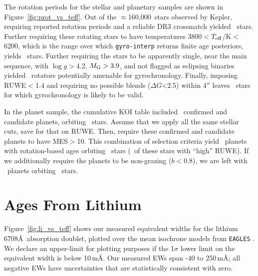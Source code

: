 \documentclass[11pt,twocolumn,tighten]{aastex63}
\newcommand{\nkeplerstars}{$\approx$160{,}000}
\begin{document}
The rotation periods for the stellar and planetary samples are shown
in Figure~\ref{fig:prot_vs_teff}.  Out of the \nkeplerstars\ stars
observed by Kepler, requiring reported rotation periods and a reliable
DR3 crossmatch yielded \nuniqstarsantosrot\ stars.  Further requiring
these rotating stars to have temperatures 3800$<$$T_{\rm
eff}$/K$<$6200, which is the range over which \texttt{gyro-interp}
returns finite age posteriors, yields \nuniqstarsantosrotteffcut\
stars.  Further requiring the stars to be apparently single, near the main
sequence, with $\log g$$>$4.2, $M_{\rm G}>3.9$, and not flagged as
eclipsing binaries yielded \nuniqstarsantosallbutruwe\ rotators
potentially amenable for gyrochronology.  Finally, imposing RUWE$<$1.4
and requiring no possible blends ($\Delta G$<2.5) within 4$''$ leaves
\nuniqstarsantosrotgyroappl\ stars for which gyrochronology is likely
to be valid.


In the planet sample, the cumulative KOI table included
\nnonfpcumkois\ confirmed and candidate planets, orbiting
\nnonfpcumkoihosts\ stars.  Assume that we apply all the same stellar
cuts, save for that on RUWE.  Then, require these confirmed and
candidate planets to have MES$>$10.  This combination of selection
criteria yield \nplwgyroagewithgrazingandhighruwe\ planets with
rotation-based ages orbiting
\nplhoststarwgyroagewithgrazingandhighruwe\ stars
(\nplhoststarwgyroagejusthighruwe\ of these stars with ``high'' RUWE).
If we additionally require the planets to be non-grazing ($b<0.8$),
we are left with \nplwgyroagenograzing\ planets orbiting
\nplhoststarwgyroagenograzing\ stars.




\section{Ages From Lithium}
\label{sec:liage}


Figure~\ref{fig:li_vs_teff} shows our measured equivalent widths for
the lithium 6708\AA\ absorption doublet, plotted over the mean
isochrone models from \texttt{EAGLES} \citep{Jeffries_2023}.  We
declare an upper-limit for plotting purposes if the 1$\sigma$ lower
limit on the equivalent width is below 10\,m\AA.  Our measured EWs
span -40 to 250\,m\AA; all negative EWs have uncertainties that are
statistically consistent with zero.
\end{document}
